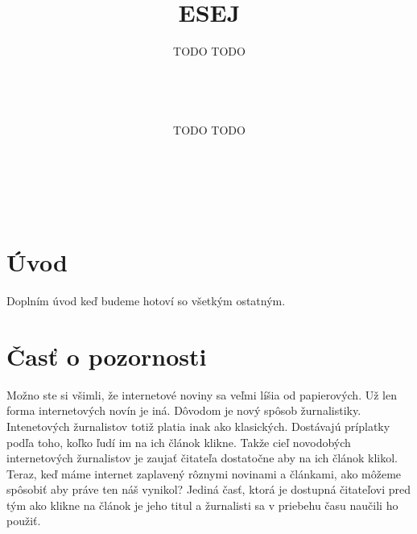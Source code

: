 \documentclass{sig-alternate}
\begin{document}
\title{ESEJ}


\author{
\alignauthor
TODO TODO\\
       \\
       \\
       \\
       \\
\alignauthor
TODO TODO\\
       \\
       \\
       \\
       \\
}

\maketitle

\section{Úvod}

Doplním úvod keď budeme hotoví so všetkým ostatným.

\section{Časť o pozornosti}

Možno ste si všimli, že internetové noviny sa veľmi líšia od papierových. Už len forma internetových novín je iná. Dôvodom je nový spôsob žurnalistiky.
Intenetových žurnalistov totiž platia inak ako klasických. Dostávajú príplatky podľa toho, koľko ľudí im na ich článok klikne. Takže cieľ novodobých internetových žurnalistov je zaujať čitateľa dostatočne aby na ich článok klikol. Teraz, keď máme internet zaplavený rôznymi novinami a článkami, ako môžeme spôsobiť aby práve ten náš vynikol? Jediná časť, ktorá je dostupná čitateľovi pred tým ako klikne na článok je jeho titul a žurnalisti sa v priebehu času naučili ho použiť.

%
%

\balancecolumns
\end{document}
